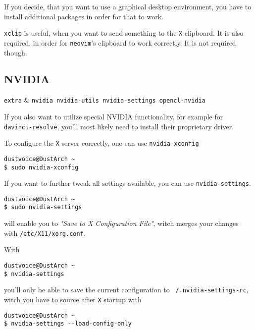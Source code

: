 \documentclass[10pt]{dustdoc}
\begin{document}
If you decide, that you want to use a graphical desktop environment, you have to install additional packages in order for that to work.

\begin{NOTE}
    \texttt{xclip} is useful, when you want to send something to the \texttt{X} clipboard.
    It is also required, in order for \texttt{neovim}'s clipboard to work correctly.
    It is not required though.
\end{NOTE}

\subsection{NVIDIA}
\label{sec:nvidia}

\begin{packagetable}
    \texttt{extra} & \texttt{nvidia nvidia-utils nvidia-settings opencl-nvidia} \\
\end{packagetable}

If you also want to utilize special NVIDIA functionality, for example for \texttt{davinci-resolve}, you’ll most likely need to install their proprietary driver.

To configure the \texttt{X} server correctly, one can use \texttt{nvidia-xconfig}

\begin{verbatim}
dustvoice@DustArch ~
$ sudo nvidia-xconfig
\end{verbatim}

If you want to further tweak all settings available, you can use \texttt{nvidia-settings}.

\begin{verbatim}
dustvoice@DustArch ~
$ sudo nvidia-settings
\end{verbatim}

\noindent
will enable you to \emph{"Save to X Configuration File"}, witch merges your changes with \texttt{/etc/X11/xorg.conf}.

With

\begin{verbatim}
dustvoice@DustArch ~
$ nvidia-settings
\end{verbatim}

\noindent
you’ll only be able to save the current configuration to \texttt{~/.nvidia-settings-rc}, witch you have to source after \texttt{X} startup with

\begin{verbatim}
dustvoice@DustArch ~
$ nvidia-settings --load-config-only
\end{verbatim}
\end{document}
